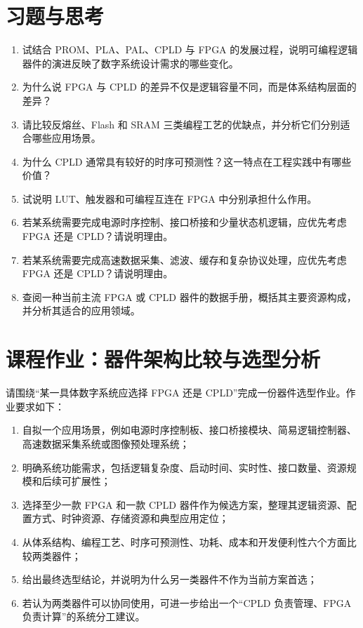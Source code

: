 \section{习题与思考}\label{ux4e60ux9898ux4e0eux601dux8003}

\begin{enumerate}
\def\labelenumi{\arabic{enumi}.}
\tightlist
\item
  试结合 PROM、PLA、PAL、CPLD 与 FPGA
  的发展过程，说明可编程逻辑器件的演进反映了数字系统设计需求的哪些变化。\\
\item
  为什么说 FPGA 与 CPLD
  的差异不仅是逻辑容量不同，而是体系结构层面的差异？\\
\item
  请比较反熔丝、Flash 和 SRAM
  三类编程工艺的优缺点，并分析它们分别适合哪些应用场景。\\
\item
  为什么 CPLD
  通常具有较好的时序可预测性？这一特点在工程实践中有哪些价值？\\
\item
  试说明 LUT、触发器和可编程互连在 FPGA 中分别承担什么作用。\\
\item
  若某系统需要完成电源时序控制、接口桥接和少量状态机逻辑，应优先考虑
  FPGA 还是 CPLD？请说明理由。\\
\item
  若某系统需要完成高速数据采集、滤波、缓存和复杂协议处理，应优先考虑
  FPGA 还是 CPLD？请说明理由。\\
\item
  查阅一种当前主流 FPGA 或 CPLD
  器件的数据手册，概括其主要资源构成，并分析其适合的应用领域。
\end{enumerate}

\section{课程作业：器件架构比较与选型分析}\label{ux8bfeux7a0bux4f5cux4e1aux5668ux4ef6ux67b6ux6784ux6bd4ux8f83ux4e0eux9009ux578bux5206ux6790}

请围绕``某一具体数字系统应选择 FPGA 还是
CPLD''完成一份器件选型作业。作业要求如下：

\begin{enumerate}
\def\labelenumi{\arabic{enumi}.}
\tightlist
\item
  自拟一个应用场景，例如电源时序控制板、接口桥接模块、简易逻辑控制器、高速数据采集系统或图像预处理系统；
\item
  明确系统功能需求，包括逻辑复杂度、启动时间、实时性、接口数量、资源规模和后续可扩展性；
\item
  选择至少一款 FPGA 和一款 CPLD
  器件作为候选方案，整理其逻辑资源、配置方式、时钟资源、存储资源和典型应用定位；
\item
  从体系结构、编程工艺、时序可预测性、功耗、成本和开发便利性六个方面比较两类器件；
\item
  给出最终选型结论，并说明为什么另一类器件不作为当前方案首选；
\item
  若认为两类器件可以协同使用，可进一步给出一个``CPLD 负责管理、FPGA
  负责计算''的系统分工建议。
\end{enumerate}

